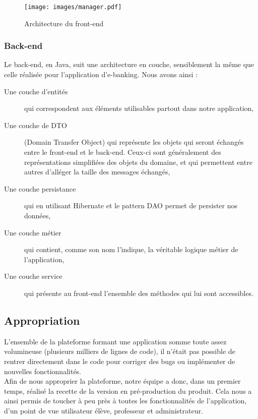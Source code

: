 \begin{figure}[H]
	\centering
	\texttt{[image: images/manager.pdf]}
	\caption{Architecture du front-end}
\end{figure}


\subsubsection{Back-end}

Le back-end, en Java, suit une architecture en couche, sensiblement la même que celle réalisée pour l'application d'e-banking. Nous avons ainsi :

\begin{description}
	\item[Une couche d'entités] qui correspondent aux éléments utilisables partout dans notre application,
	\item[Une couche de DTO]  (Domain Transfer Object) qui représente les objets qui seront échangés entre le front-end et le back-end. Ceux-ci sont généralement des représentations simplifiées des objets du domaine, et qui permettent entre autres d'alléger la taille des messages échangés,
	\item[Une couche persistance] qui en utilisant Hibernate et le pattern DAO permet de persister nos données,
	\item[Une couche métier] qui contient, comme son nom l'indique, la véritable logique métier de l'application,
	\item[Une couche service] qui présente au front-end l'ensemble des méthodes qui lui sont accessibles.
\end{description}

\subsection{Appropriation}

L'ensemble de la plateforme \capico{} formant une application somme toute assez volumineuse (plusieurs milliers de lignes de code), il n'était pas possible de rentrer directement dans le code pour corriger des bugs ou implémenter de nouvelles fonctionnalités.\\

Afin de nous approprier la plateforme, notre équipe a donc, dans un premier temps, réalisé la recette de la version en pré-production du produit. Cela nous a ainsi permis de toucher à peu près à toutes les fonctionnalités de l'application, d'un point de vue utilisateur élève, professeur et administrateur.\\

